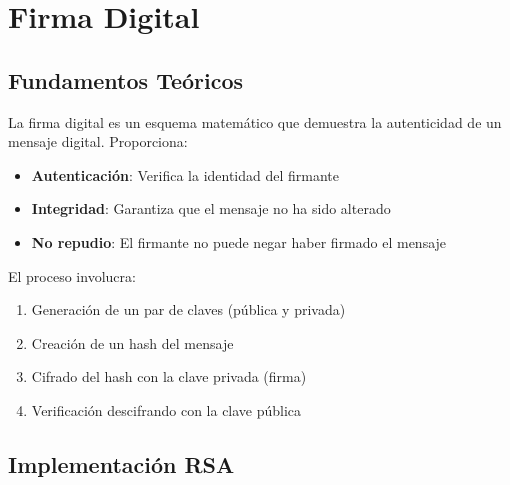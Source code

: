 \documentclass[12pt,a4paper]{article}
\begin{document}
\newpage

\section{Firma Digital}

\subsection{Fundamentos Teóricos}

La firma digital es un esquema matemático que demuestra la autenticidad de un
mensaje digital. Proporciona:

\begin{itemize}
	\item \textbf{Autenticación}: Verifica la identidad del firmante
	\item \textbf{Integridad}: Garantiza que el mensaje no ha sido alterado
	\item \textbf{No repudio}: El firmante no puede negar haber firmado el mensaje
\end{itemize}

El proceso involucra:
\begin{enumerate}
	\item Generación de un par de claves (pública y privada)
	\item Creación de un hash del mensaje
	\item Cifrado del hash con la clave privada (firma)
	\item Verificación descifrando con la clave pública
\end{enumerate}

\subsection{Implementación RSA}
\end{document}
